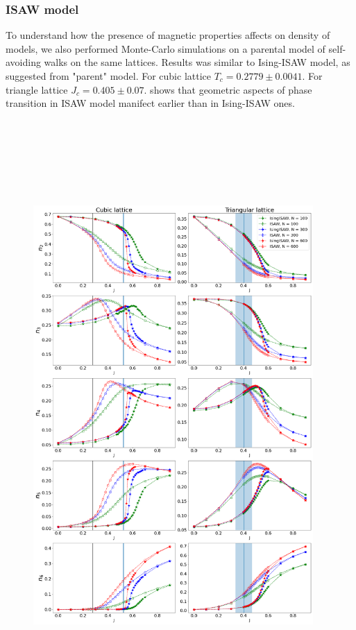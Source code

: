 \documentclass[a4paper]{jpconf}
\begin{document}
\subsubsection{ISAW model}

To understand how the presence of magnetic properties affects on density of models, we also performed Monte-Carlo simulations on a parental model of self-avoiding walks on the same lattices. Results was similar to Ising-ISAW model, as suggested from "parent" model. For cubic lattice $T_{c} = 0.2779\pm 0.0041 $\cite{Tesi1996}. For triangle lattice $J_{c} = 0.405 \pm 0.07 $\cite{Privman1986}.  shows that geometric aspects of phase transition in ISAW model manifect earlier than in Ising-ISAW ones.  

\begin{figure}
    \centering
    \includegraphics[width=0.95\textwidth, height=22.5cm]{Images/Ising_vs_ISAW.png}

\end{figure}
\end{document}
